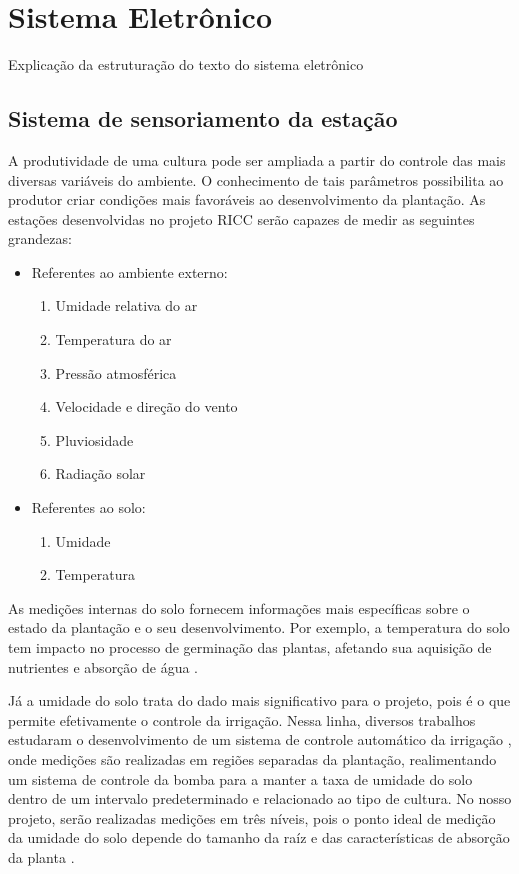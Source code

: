 \chapter[Sistema Eletrônico]{Sistema Eletrônico}

Explicação da estruturação do texto do sistema eletrônico

\section{Sistema de sensoriamento da estação}

	A produtividade de uma cultura pode ser ampliada a partir do controle das mais diversas variáveis do ambiente. O conhecimento de tais parâmetros possibilita ao produtor criar condições mais favoráveis ao desenvolvimento da plantação. As estações desenvolvidas no projeto RICC serão capazes de medir as seguintes grandezas:

	\begin{itemize}
		\item Referentes ao ambiente externo:
		\begin{enumerate}
			\item Umidade relativa do ar
			\item Temperatura do ar
			\item Pressão atmosférica
			\item Velocidade e direção do vento
			\item Pluviosidade
			\item Radiação solar
		\end{enumerate}	 		
	
		\item Referentes ao solo:	
		\begin{enumerate}
			\item Umidade
			\item Temperatura
		\end{enumerate}	
	\end{itemize}

	As medições internas do solo fornecem informações mais específicas sobre o estado da plantação e o seu desenvolvimento. Por exemplo, a temperatura do solo tem impacto no processo de germinação das plantas, afetando sua aquisição de nutrientes e absorção de água \cite{bib_sen_01_jose}.	

	Já a umidade do solo trata do dado mais significativo para o projeto, pois é o que permite efetivamente o controle da irrigação. Nessa linha, diversos trabalhos estudaram o desenvolvimento de um sistema de controle automático da irrigação \cite{romero2012research} \cite{zhao2009study}, onde medições são realizadas em regiões separadas da plantação, realimentando um sistema de controle da bomba para a manter a taxa de umidade do solo dentro de um intervalo predeterminado e relacionado ao tipo de cultura. No nosso projeto, serão realizadas medições em três níveis, pois o ponto ideal de medição da umidade do solo depende do tamanho da raíz e das características de absorção da planta \cite{su2014critical}.

